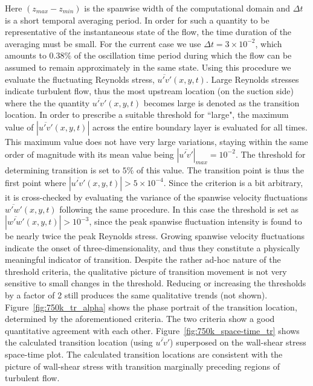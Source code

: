 Here $(z_{max} - z_{min})$ is the spanwise width of the computational domain and $\Delta t$ is a short temporal averaging period. In order for such a quantity to be representative of the instantaneous state of the flow, the time duration of the averaging must be small. For the current case we use $\Delta t=3\times10^{-2}$, which amounts to $0.38\%$ of the oscillation time period during which the flow can be assumed to remain approximately in the same state. Using this procedure we evaluate the fluctuating Reynolds stress, $\overline{u'v'}(x,y,t)$. Large Reynolds stresses indicate turbulent flow, thus the most upstream location (on the suction side) where the the quantity $\overline{u'v'}(x,y,t)$ becomes large is denoted as the transition location. In order to prescribe a suitable threshold for ``large", the maximum value of $|\overline{u'v'}(x,y,t)|$ across the entire boundary layer is evaluated for all times. This maximum value does not have very large variations, staying within the same order of magnitude with its mean value being $|\overline{u'v'}|_{max}=10^{-2}$. The threshold for determining transition is set to $5\%$ of this value. The transition point is thus the first point where $|\overline{u'v'}(x,y,t)|>5\times10^{-4}$. Since the criterion is a bit arbitrary, it is cross-checked by evaluating the variance of the spanwise velocity fluctuations $\overline{w'w'}(x,y,t)$ following the same procedure. In this case the threshold is set as $|\overline{w'w'}(x,y,t)|>10^{-3}$, since the peak spanwise fluctuation intensity is found to be nearly twice the peak Reynolds stress. Growing spanwise velocity fluctuations indicate the onset of three-dimensionality, and thus they constitute a physically meaningful indicator of transition. Despite the rather ad-hoc nature of the threshold criteria, the qualitative picture of transition movement is not very sensitive to small changes in the threshold. Reducing or increasing the thresholds by a factor of 2 still produces the same qualitative trends (not shown). Figure~\ref{fig:750k_tr_alpha} shows the phase portrait of the transition location, determined by the aforementioned criteria. The two criteria show a good quantitative agreement with each other. Figure~\ref{fig:750k_space-time_tr} shows the calculated transition location (using $\overline{u'v'}$) superposed on the wall-shear stress space-time plot. The calculated transition locations are consistent with the picture of wall-shear stress with transition marginally preceding regions of turbulent flow.


